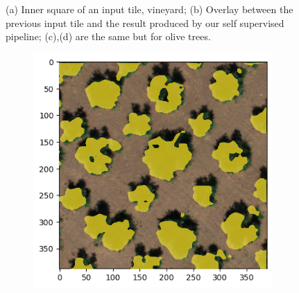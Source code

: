 \documentclass[comsoc,final]{IEEEtran}
\begin{document}
\begin{figure}
\begin{subfigure}[b]{0.45\columnwidth}
         \caption{}
         \label{maskplot:d}
     \end{subfigure}%
%        
     \caption{(a) Inner square of an input tile, vineyard; (b) Overlay between the previous input tile and the result produced by our self supervised pipeline; 
     (c),(d) are the same but for olive trees.}
     \label{fig:input_gt}%
\end{figure}

\begin{figure}{\centering%
      \begin{subfigure}[b]{0.45\columnwidth}
         \centering \includegraphics[width=\columnwidth]{ULIVO0INF}
     \end{subfigure}%
%
      \begin{subfigure}[b]{0.45\columnwidth}

\end{subfigure}}
\end{figure}
\end{document}
